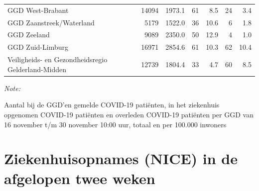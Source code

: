 \documentclass[
  english,
  man,floatsintext]{apa6}
\begin{document}
\begin{table}
\begin{threeparttable}
\begin{tabular}{lrrrrrr}
GGD West-Brabant & 14094 & 1973.1 & 61 & 8.5 & 24 & 3.4\\
GGD Zaanstreek/Waterland & 5179 & 1522.0 & 36 & 10.6 & 6 & 1.8\\
GGD Zeeland & 9089 & 2350.0 & 50 & 12.9 & 4 & 1.0\\
GGD Zuid-Limburg & 16971 & 2854.6 & 61 & 10.3 & 62 & 10.4\\
Veiligheids- en Gezondheidsregio Gelderland-Midden & 12739 & 1804.4 & 33 & 4.7 & 60 & 8.5\\
\bottomrule
\end{tabular}
\begin{tablenotes}
\item \textit{Note: } 
\item Aantal bij de GGD’en gemelde COVID-19 patiënten, in het ziekenhuis opgenomen COVID-19 patiënten en overleden COVID-19 patiënten per GGD van 16 november t/m 30 november 10:00 uur, totaal en per 100.000 inwoners
\end{tablenotes}
\end{threeparttable}
\endgroup{}
\end{table}

\newpage

\hypertarget{ziekenhuisopnames-nice-in-de-afgelopen-twee-weken}{%
\section{Ziekenhuisopnames (NICE) in de afgelopen twee weken}\label{ziekenhuisopnames-nice-in-de-afgelopen-twee-weken}}
\end{document}
